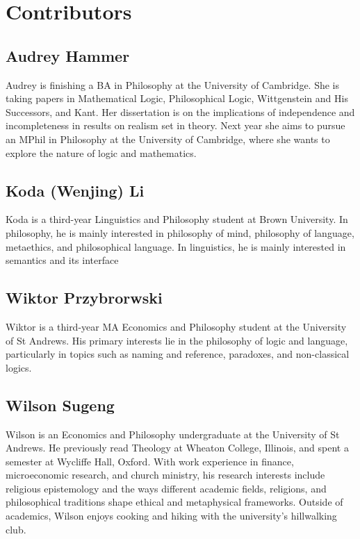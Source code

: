 \chapter{Contributors}

\section*{Audrey Hammer}

Audrey is finishing a BA in Philosophy at the University of Cambridge.
She is taking papers in Mathematical Logic, Philosophical Logic,
Wittgenstein and His Successors, and Kant. Her dissertation is on the
implications of independence and incompleteness in results on realism
set in theory. Next year she aims to pursue an MPhil in Philosophy at
the University of Cambridge, where she wants to explore the nature of
logic and mathematics.

\section*{Koda (Wenjing) Li}

Koda is a third-year Linguistics and Philosophy student at Brown
University. In philosophy, he is mainly interested in philosophy of
mind, philosophy of language, metaethics, and philosophical language.
In linguistics, he is mainly interested in semantics and its interface 

\section*{Wiktor Przybrorwski}

Wiktor is a third-year MA Economics and Philosophy student at the
University of St Andrews. His primary interests lie in the philosophy
of logic and language, particularly in topics such as naming and
reference, paradoxes, and non-classical logics.

\section*{Wilson Sugeng}

Wilson is an Economics and Philosophy undergraduate at the University of
St Andrews. He previously read Theology at Wheaton College, Illinois,
and spent a semester at Wycliffe Hall, Oxford. With work experience in
finance, microeconomic research, and church ministry, his research
interests include religious epistemology and the ways different academic
fields, religions, and philosophical traditions shape ethical and
metaphysical frameworks. Outside of academics, Wilson enjoys cooking and
hiking with the university's hillwalking club.
